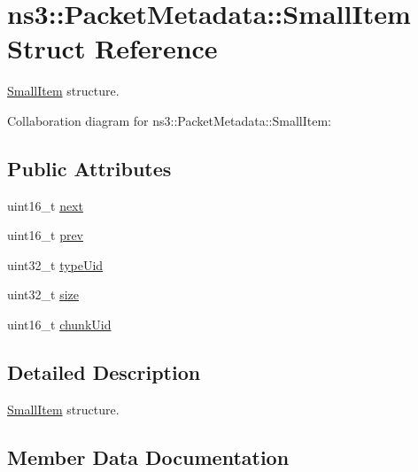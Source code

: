 \hypertarget{structns3_1_1PacketMetadata_1_1SmallItem}{}\section{ns3\+:\+:Packet\+Metadata\+:\+:Small\+Item Struct Reference}
\label{structns3_1_1PacketMetadata_1_1SmallItem}


\hyperlink{structns3_1_1PacketMetadata_1_1SmallItem}{Small\+Item} structure.  




Collaboration diagram for ns3\+:\+:Packet\+Metadata\+:\+:Small\+Item\+:
\subsection*{Public Attributes}
\begin{DoxyCompactItemize}
\item 
uint16\+\_\+t \hyperlink{structns3_1_1PacketMetadata_1_1SmallItem_a2f5c9e2e9e29b6079de9fdad01537f13}{next}
\item 
uint16\+\_\+t \hyperlink{structns3_1_1PacketMetadata_1_1SmallItem_ade45c814d12b7f18c0b412d037707271}{prev}
\item 
uint32\+\_\+t \hyperlink{structns3_1_1PacketMetadata_1_1SmallItem_a8eac5049e323f4651de81109d3037584}{type\+Uid}
\item 
uint32\+\_\+t \hyperlink{structns3_1_1PacketMetadata_1_1SmallItem_a9110e235a7387d19620985aa66ea7020}{size}
\item 
uint16\+\_\+t \hyperlink{structns3_1_1PacketMetadata_1_1SmallItem_a427c33307aeeae9080e7bd71b09d06c0}{chunk\+Uid}
\end{DoxyCompactItemize}


\subsection{Detailed Description}
\hyperlink{structns3_1_1PacketMetadata_1_1SmallItem}{Small\+Item} structure. 

\subsection{Member Data Documentation}

